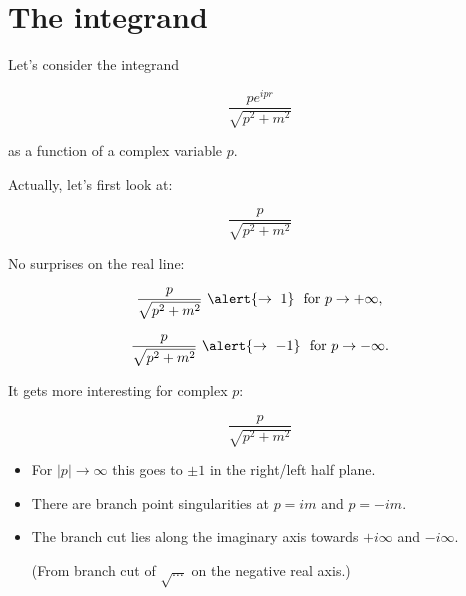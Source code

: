 \documentclass[aspectratio=169]{beamer}
\newcommand{\sqrtpm}{\sqrt{p^2 + m^2}}
\newcommand{\envelope}{\frac{p}{\sqrtpm}}
\newcommand{\integrand}{\frac{p e^{ipr}}{\sqrt{p^2 + m^2}}}
\begin{document}
\section{The integrand}

\begin{frame}
Let's consider the integrand

$$\integrand$$

\pause
as a function of a \alert{complex} variable $p$.
\end{frame}


\begin{frame}
Actually, let's first look at:

\pause
$$\envelope$$

\pause
No surprises on the real line:

\pause
$$\envelope \ \alert{\rightarrow \ 1} \ \textrm{ for } p \rightarrow +\infty,$$

\pause
$$\envelope \ \alert{\rightarrow \ -1} \ \textrm{ for } p \rightarrow -\infty.$$

\end{frame}





\begin{frame}
It gets more interesting for complex $p$:

\pause
$$\envelope$$

\begin{itemize}

\pause
\item For $|p| \rightarrow \infty$ this goes to \alert{$\pm 1$} in the right/left half plane.

\pause
\item There are branch point \alert{singularities} at $p = im$ and $p = -im$.

\pause
\item The \alert{branch cut} lies along the imaginary axis towards $+i\infty$ and $-i\infty$.
\pause

(From branch cut of $\sqrt{\ldots}$ on the negative real axis.)
\end{itemize}
\end{frame}
\end{document}

